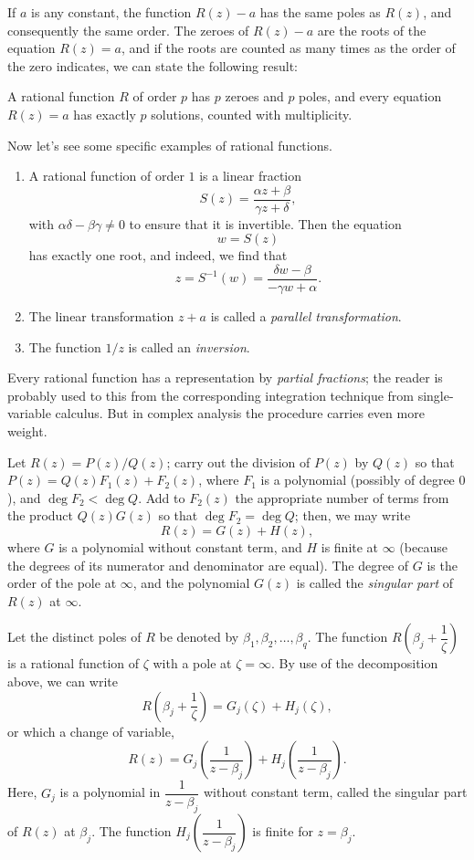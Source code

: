 If $a$ is any constant, the function $R(z)-a$ has the same poles as $R(z)$, and consequently the same order. The zeroes of $R(z)-a$ are the roots of the equation $R(z)=a$, and if the roots are counted as many times as the order of the zero indicates, we can state the following result:
\begin{proposition}
	A rational function $R$ of order $p$ has $p$ zeroes and $p$ poles, and every equation $R(z)=a$ has exactly $p$ solutions, counted with multiplicity.
\end{proposition}
Now let's see some specific examples of rational functions.
\begin{example}
	\begin{enumerate}
	\item A rational function of order $1$ is a linear fraction $$S(z)=\dfrac{\alpha z+\beta}{\gamma z+\delta},$$ with $\alpha \delta-\beta \gamma \neq 0$ to ensure that it is invertible. Then the equation $$w=S(z)$$ has exactly one root, and indeed, we find that $$z=S^{-1}(w)=\dfrac{\delta w-\beta}{-\gamma w+\alpha}.$$
	\item The linear transformation $z+a$ is called a \emph{parallel transformation}.
	\item The function $1/z$ is called an \emph{inversion}.
	\end{enumerate}
\end{example}

Every rational function has a representation by \textit{partial fractions}; the reader is probably used to this from the corresponding integration technique from single-variable calculus. But in complex analysis the procedure carries even more weight.

Let $R(z)=P(z)/Q(z)$; carry out the division of $P(z)$ by $Q(z)$ so that $P(z)=Q(z)F_1(z)+F_2(z)$, where $F_1$ is a polynomial (possibly of degree $0$), and $\deg F_2<\deg Q$. Add to $F_2(z)$ the appropriate number of terms from the product $Q(z)G(z)$ so that $\deg F_2=\deg Q$; then, we may write $$R(z)=G(z)+H(z),$$ where $G$ is a polynomial without constant term, and $H$ is finite at $\infty$ (because the degrees of its numerator and denominator are equal). The degree of $G$ is the order of the pole at $\infty$, and the polynomial $G(z)$ is called the \textit{singular part} of $R(z)$ at $\infty$.

Let the distinct poles of $R$ be denoted by $\beta_1,\beta_2,\dots,\beta_q$. The function $R\left(\beta_j+\dfrac{1}{\zeta}\right)$ is a rational function of $\zeta$ with a pole at $\zeta=\infty$. By use of the decomposition above, we can write $$R\left(\beta_j+\dfrac{1}{\zeta}\right)=G_j(\zeta)+H_j(\zeta),$$ or which a change of variable, $$R(z)=G_j\left(\dfrac{1}{z-\beta_j}\right)+H_j\left(\dfrac{1}{z-\beta_j}\right).$$ Here, $G_j$ is a polynomial in $\dfrac{1}{z-\beta_j}$ without constant term, called the singular part of $R(z)$ at $\beta_j$. The function $H_j\left(\dfrac{1}{z-\beta_j}\right)$ is finite for $z=\beta_j$.

